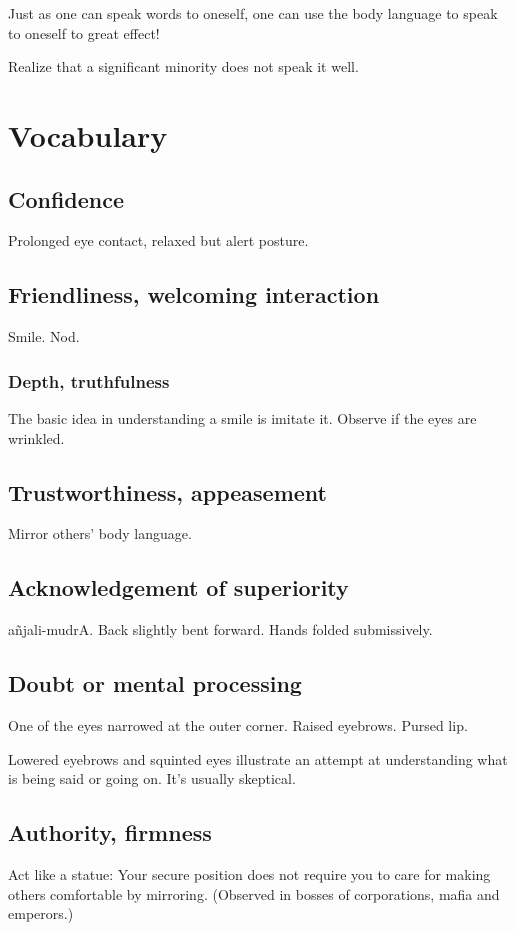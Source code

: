\documentclass[oneside, article]{memoir}
\begin{document}
Just as one can speak words to oneself, one can use the body language to speak to oneself to great effect!

Realize that a significant minority does not speak it well.

\section{Vocabulary}
\subsection{Confidence}
Prolonged eye contact, relaxed but alert posture.

\subsection{Friendliness, welcoming interaction}
Smile. Nod.

\subsubsection{Depth, truthfulness}
The basic idea in understanding a smile is imitate it. Observe if the eyes are wrinkled.

\subsection{Trustworthiness, appeasement}
Mirror others' body language.

\subsection{Acknowledgement of superiority}
a\~njali-mudrA. Back slightly bent forward. Hands folded submissively.

\subsection{Doubt or mental processing}
One of the eyes narrowed at the outer corner. Raised eyebrows. Pursed lip.

Lowered eyebrows and squinted eyes illustrate an attempt at understanding what is being said or going on. It's usually skeptical.

\subsection{Authority, firmness}
Act like a statue: Your secure position does not require you to care for making others comfortable by mirroring. (Observed in bosses of corporations, mafia and emperors.)
\end{document}
